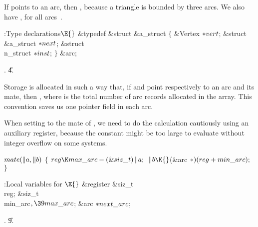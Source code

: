 \smallskip\noindent
If  points to an arc, then , because a triangle
is bounded by three arcs. We also have , for
all arcs~.

\Y\B\4:Type declarations\X${}\E{}$\6
\&{typedef} \&{struct} \&{a\_struct} ${}\{{}$\1\6
\&{Vertex} ${}{*}\\{vert}{}$;\6
\&{struct} \&{a\_struct} ${}{*}\\{next}{}$;\6
\&{struct} \\{n\_struct} ${}{*}\\{inst}{}$;\2\6
${}\}{}$ \&{arc};\par
{}.
\U4.\fi

Storage is allocated in such a way that, if  and  point
respectively
to an arc and its mate, then , where  is
the total number of arc records allocated in the  array.
This
convention saves us one pointer field in each arc.

When setting  to the mate of , we need to do the calculation
cautiously using an auxiliary register, because the constant
 might be too
large to evaluate without
integer overflow on some systems.

\Y\B\4\D$\\{mate}(\|a,\|b)$ \6
${}\{{}$\1\6
${}\\{reg}\K\\{max\_arc}-(\&{siz\_t})\,\|a;{}$\6
${}\|b\K{}$(\&{arc} ${}{*})(\\{reg}+\\{min\_arc});{}$\6
\4${}\}{}$\2\par
\Y\B\4:Local variables for \X${}\E{}$\6
\&{register} \&{siz\_t} \\{reg};\6
\&{siz\_t} \\{min\_arc}${},\39\\{max\_arc}{}$;\6
\&{arc} ${}{*}\\{next\_arc}{}$;\par
{}.
\U9.\fi

